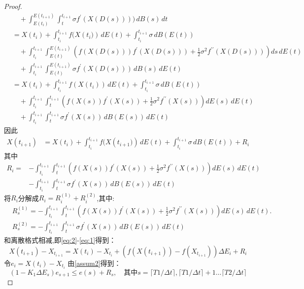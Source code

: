 \begin{proof}
\begin{align*}
		&\quad + \int_{E(t_i)}^{E(t_{i+1})} \int_{t}^{t_{i+1}}\sigma f^{\prime}(X(D(s)))) \, dB(s) \, dt \\
		&= X(t_i) + \int_{t_i}^{t_{i+1}} f(X({t_i)}) \, dE(t) + \int_{t_i}^{t_{i+1}} \sigma \, dB(E(t)) \\
		&\quad + \int_{t_i}^{t_{i+1}} \int_{E(t)}^{E(t_{i+1})} \left( f(X(D(s))) f^{\prime}(X(D(s))) + \frac{1}{2} \sigma^2 f^{\prime\prime}(X(D(s))) \right) ds \, dE(t) \\
		&\quad + \int_{t_i}^{t_{i+1}} \int_{E(t)}^{E(t_{i+1})}\sigma f^{\prime}(X(D(s))) \, dB(s) \, dE(t)\\
		&= X(t_i) + \int_{t_i}^{t_{i+1}} f(X({t_i})) \, dE(t) + \int_{t_i}^{t_{i+1}} \sigma \, dB(E(t)) \\
		&\quad + \int_{t_i}^{t_{i+1}} \int_{t}^{t_{i+1}} \left( f(X(s)) f^{\prime}(X(s)) + \frac{1}{2} \sigma^2 f^{\prime\prime}(X(s)) \right) dE(s) \, dE(t) \\
		&\quad + \int_{t_i}^{t_{i+1}} \int_{t}^{t_{i+1}}\sigma f^{\prime}(X(s)) \, dB(E(s)) \, dE(t)
	\end{align*}
	因此
	\begin{align}\label{eq:2}
		X(t_{i+1})
		&= X(t_i) + \int_{t_i}^{t_{i+1}} f(X({t_{i+1})}) \, dE(t) + \int_{t_i}^{t_{i+1}} \sigma \, dB(E(t)) + R_i
	\end{align}
	其中
	\begin{align*}
		R_i = &-\int_{t_i}^{t_{i+1}} \int_{t}^{t_{i+1}} \left( f(X(s)) f^{\prime}(X(s)) + \frac{1}{2} \sigma^2 f^{\prime\prime}(X(s)) \right) dE(s) \, dE(t)\\
		&-\int_{t_i}^{t_{i+1}} \int_{t}^{t_{i+1}} \sigma f^{\prime}(X(s)) \, dB(E(s)) \, dE(t)
	\end{align*}
	将$R_i$分解成$R_i = R_i^{(1)} + R_i^{(2)}$,其中:
	\begin{align*}
		& R_s^{(1)} = -\int_{t_i}^{t_{i+1}} \int_{t}^{t_{i+1}} \left( f(X(s)) f^{\prime}(X(s)) + \frac{1}{2} \sigma^2 f^{\prime\prime}(X(s)) \right) dE(s) \, dE(t).\\
		& R_s^{(2)} = -\int_{t_i}^{t_{i+1}} \int_{t}^{t_{i+1}} \sigma f^{\prime}(X(s)) \, dB(E(s)) \, dE(t)  
	\end{align*}
	和离散格式相减,即\cref{eq:2}-\cref{eq:1}得到：
	\begin{equation}
		X({t_{i+1}})-X_{t_{i+1}}=X({t_i})-X_{t_i}+(f{(X({t_{i+1}}))}-f{(X_{t_{i+1}})})\Delta E_{i}+R_{i}
	\end{equation}
	令$e_i = X({t_i})-X_{t_i}$
	由\cref{assum2}得到：
	\begin{equation}
		(1-K_1\Delta E_s)e_{s+1}\leq e(s)+R_{s},\quad\text{其中}s=\lceil T1/\Delta t \rceil,\lceil T1/\Delta t \rceil+1 \ldots \lceil T2/\Delta t \rceil

\end{equation}
\end{proof}
